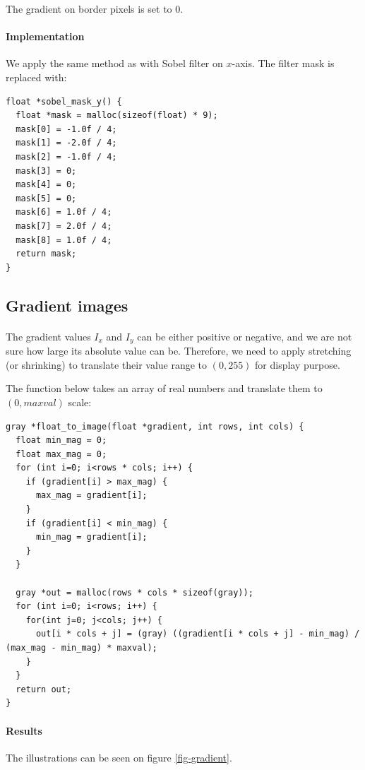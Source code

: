 \documentclass[a4paper, 10pt]{article}
\begin{document}
The gradient on border pixels is set to $0$.

\paragraph{Implementation}
We apply the same method as with Sobel filter on $x$-axis. The filter mask is replaced with:
\begin{lstlisting}[frame=single]
float *sobel_mask_y() {
  float *mask = malloc(sizeof(float) * 9);
  mask[0] = -1.0f / 4;
  mask[1] = -2.0f / 4;
  mask[2] = -1.0f / 4;
  mask[3] = 0;
  mask[4] = 0;
  mask[5] = 0;
  mask[6] = 1.0f / 4;
  mask[7] = 2.0f / 4;
  mask[8] = 1.0f / 4;
  return mask;
}
\end{lstlisting}

\subsection{Gradient images}
\paragraph{} The gradient values $I_x$ and $I_y$ can be either positive or negative, and we are not sure how large its absolute value can be. Therefore, we need to apply stretching (or shrinking) to translate their value range to $(0, 255)$ for display purpose.

The function below takes an array of real numbers and translate them to $(0, maxval)$ scale:
\begin{lstlisting}[frame=single]
gray *float_to_image(float *gradient, int rows, int cols) {
  float min_mag = 0;
  float max_mag = 0;
  for (int i=0; i<rows * cols; i++) {
    if (gradient[i] > max_mag) {
      max_mag = gradient[i];
    }
    if (gradient[i] < min_mag) {
      min_mag = gradient[i];
    }
  }

  gray *out = malloc(rows * cols * sizeof(gray));
  for (int i=0; i<rows; i++) {
    for(int j=0; j<cols; j++) {
      out[i * cols + j] = (gray) ((gradient[i * cols + j] - min_mag) / (max_mag - min_mag) * maxval);
    }
  }
  return out;
}
\end{lstlisting}

\paragraph{Results} The illustrations can be seen on figure \ref{fig-gradient}.
\end{document}
